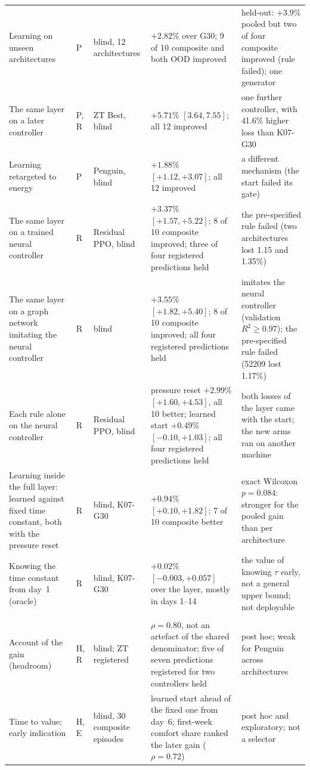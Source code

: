 {\begin{longtable}{>{\raggedright\arraybackslash}p{3.0cm}>{\raggedright\arraybackslash}p{0.75cm}>{\raggedright\arraybackslash}p{1.9cm}>{\raggedright\arraybackslash}p{3.4cm}>{\raggedright\arraybackslash}p{3.5cm}}
Learning on unseen architectures & P & blind, 12 architectures & $+2.82$\% over G30; 9 of 10 composite and both OOD improved & held-out: $+3.9$\% pooled but two of four composite improved (rule failed); one generator\\
The same layer on a later controller & P, R & ZT Best, blind & $+5.71$\% $[3.64, 7.55]$; all 12 improved & one further controller, with 41.6\% higher loss than K07-G30\\
Learning retargeted to energy & P & Penguin, blind & $+1.88$\% $[+1.12, +3.07]$; all 12 improved & a different mechanism (the start failed its gate)\\
The same layer on a trained neural controller & R & Residual PPO, blind & $+3.37$\% $[+1.57, +5.22]$; 8 of 10 composite improved; three of four registered predictions held & the pre-specified rule failed (two architectures lost 1.15 and 1.35\%)\\
The same layer on a graph network imitating the neural controller & R & blind & $+3.55$\% $[+1.82, +5.40]$; 8 of 10 composite improved; all four registered predictions held & imitates the neural controller (validation $R^2 \ge 0.97$); the pre-specified rule failed (52209 lost 1.17\%)\\
Each rule alone on the neural controller & R & Residual PPO, blind & pressure reset $+2.99$\% $[+1.60, +4.53]$, all 10 better; learned start $+0.49$\% $[-0.10, +1.03]$; all four registered predictions held & both losses of the layer came with the start; the new arms ran on another machine\\
Learning inside the full layer: learned against fixed time constant, both with the pressure reset & R & blind, K07-G30 & $+0.94$\% $[+0.10, +1.82]$; 7 of 10 composite better & exact Wilcoxon $p = 0.084$: stronger for the pooled gain than per architecture\\
Knowing the time constant from day~1 (oracle) & R & blind, K07-G30 & $+0.02$\% $[-0.003, +0.057]$ over the layer, mostly in days 1--14 & the value of knowing $\tau$ early, not a general upper bound; not deployable\\
\addlinespace
\multicolumn{5}{l}{\textbf{When does the layer help?} (\cref{sec:when,sec:lb})}\\
Account of the gain (headroom) & H, R & blind; ZT registered & $\rho = 0.80$, not an artefact of the shared denominator; five of seven predictions registered for two controllers held & post hoc; weak for Penguin across architectures\\
Time to value; early indication & H, E & blind, 30 composite episodes & learned start ahead of the fixed one from day~6; first-week comfort share ranked the later gain ($\rho = 0.72$) & post hoc and exploratory; not a selector\\

\end{longtable}}

